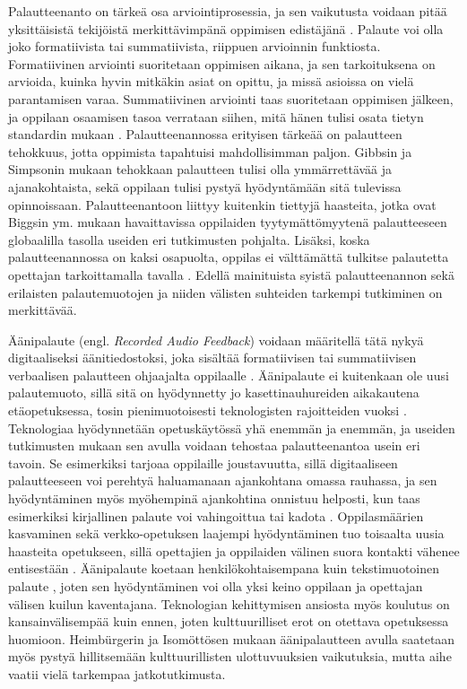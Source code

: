 \documentclass[utf8]{gradu3}
\begin{document}
Palautteenanto on tärkeä osa arviointiprosessia, ja sen vaikutusta voidaan pitää yksittäisistä tekijöistä merkittävimpänä oppimisen edistäjänä \parencite{gibbs2004}. Palaute voi olla joko formatiivista tai summatiivista, riippuen arvioinnin funktiosta. Formatiivinen arviointi suoritetaan oppimisen aikana, ja sen tarkoituksena on arvioida, kuinka hyvin mitkäkin asiat on opittu, ja missä asioissa on vielä parantamisen varaa. Summatiivinen arviointi taas suoritetaan oppimisen jälkeen, ja oppilaan osaamisen tasoa verrataan siihen, mitä hänen tulisi osata tietyn standardin mukaan \parencite{biggs2011}. Palautteenannossa erityisen tärkeää on palautteen tehokkuus, jotta oppimista tapahtuisi mahdollisimman paljon. Gibbsin ja Simpsonin \parencite*{gibbs2004} mukaan tehokkaan palautteen tulisi olla ymmärrettävää ja ajanakohtaista, sekä oppilaan tulisi pystyä hyödyntämään sitä tulevissa opinnoissaan. Palautteenantoon liittyy kuitenkin tiettyjä haasteita, jotka ovat Biggsin ym. \parencite*{biggs2011} mukaan havaittavissa oppilaiden tyytymättömyytenä palautteeseen globaalilla tasolla useiden eri tutkimusten pohjalta. Lisäksi, koska palautteenannossa on kaksi osapuolta, oppilas ei välttämättä tulkitse palautetta opettajan tarkoittamalla tavalla \parencite{sadler2010}. Edellä mainituista syistä palautteenannon sekä erilaisten palautemuotojen ja niiden välisten suhteiden tarkempi tutkiminen on merkittävää. 

Äänipalaute (engl. \textit{Recorded Audio Feedback}) voidaan määritellä tätä nykyä digitaaliseksi äänitiedostoksi, joka sisältää formatiivisen tai summatiivisen verbaalisen palautteen ohjaajalta oppilaalle \parencite{developing}. Äänipalaute ei kuitenkaan ole uusi palautemuoto, sillä sitä on hyödynnetty jo kasettinauhureiden aikakautena etäopetuksessa, tosin pienimuotoisesti teknologisten rajoitteiden vuoksi \parencite{developing}. Teknologiaa hyödynnetään opetuskäytössä yhä enemmän ja enemmän, ja useiden tutkimusten mukaan sen avulla voidaan tehostaa palautteenantoa usein eri tavoin. Se esimerkiksi tarjoaa oppilaille joustavuutta, sillä digitaaliseen palautteeseen voi perehtyä haluamanaan ajankohtana omassa rauhassa, ja sen hyödyntäminen myös myöhempinä ajankohtina onnistuu helposti, kun taas esimerkiksi kirjallinen palaute voi vahingoittua tai kadota \parencite{technology}. Oppilasmäärien kasvaminen sekä verkko-opetuksen laajempi hyödyntäminen tuo toisaalta uusia haasteita opetukseen, sillä opettajien ja oppilaiden välinen suora kontakti vähenee entisestään \parencite{engaging}. Äänipalaute koetaan henkilökohtaisempana kuin tekstimuotoinen palaute \parencite{evaluating}, joten sen hyödyntäminen voi olla yksi keino oppilaan ja opettajan välisen kuilun kaventajana. Teknologian kehittymisen ansiosta myös koulutus on kansainvälisempää kuin ennen, joten kulttuurilliset erot on otettava opetuksessa huomioon. Heimbürgerin ja Isomöttösen \parencite*{moderating} mukaan äänipalautteen avulla saatetaan myös pystyä hillitsemään kulttuurillisten ulottuvuuksien vaikutuksia, mutta aihe vaatii vielä tarkempaa jatkotutkimusta.
\end{document}
